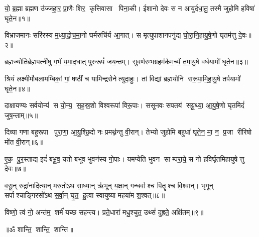 

यो॒ ब्र॒ह्मा ब्रह्मण उ॑ज्जहा॒र॒ प्रा॒णैः शिर॒ कृत्तिवासा पिना॒की।
ईशानो देवः स न आयु॑र्दधा॒तु॒ तस्मै जुहोमि हविषा॑ घृते॒न॥१॥

विभ्राजमानः सरि॑रस्य म॒ध्या॒द्रो॒च॒मा॒नो घर्मरुचि॑र्य आ॒गात्।
स मृत्युपाशानपनु॑द्य घो॒रा॒नि॒हा॒यु॒षे॒णो घृतम॑त्तु दे॒वः॥२॥

ब्रह्मज्योतिर्ब्रह्मपत्नी॑षु  ग॒र्भं॒ य॒मा॒द॒धात् पुरुरूपं॑ जय॒न्तम्।
सुवर्णरम्भग्रहम॑र्कम॒र्च्यं॒ त॒मा॒यु॒षे वर्धयामो॑ घृते॒न॥३॥

श्रियं लक्ष्मीमौबलामम्बिकां॒ गां॒ षष्ठीं च यामिन्द्रसेनेत्युदा॒हुः।
तां विद्यां ब्रह्मयोनि सरू॒पा॒मि॒हा॒यु॒षे तर्पयामो॑ घृते॒न॥४॥

दाक्षायण्यः सर्वयोन्य॑ स यो॒न्य॒ स॒ह॒स्र॒शो विश्वरूपा॑ विरू॒पाः।
ससूनवः सपतय॑ सयू॒थ्या॒ आ॒यु॒षे॒णो घृतमिदं॑ जुष॒न्ताम्॥५॥

दिव्या गणा बहुरूपा पुरा॒णा॒ आ॒यु॒श्छि॒दो नः प्रमथ्न॑न्तु वी॒रान्।
तेभ्यो जुहोमि बहुधा॑ घृते॒न॒ मा॒ न॒ प्र॒जा रीरिषो मो॑त वी॒रान्॥६॥

ए॒क॒ पु॒र॒स्ताद्य इदं॑ बभू॒व॒ यतो बभूव भुवन॑स्य गो॒पाः।
यमप्येति भुवन साम्परा॒ये॒ स नो हविर्घृतमिहायुषेत्तु दे॒वः॥७॥

व॒सू॒न् रुद्रा॑नादि॒त्या॒न् मरुतो॑ऽथ सा॒ध्या॒न् ऋ॑भून् य॒क्षा॒न् गन्धर्वाश्च पितॄश्च वि॒श्वान्।
 भृगून् सर्पाश्चाङ्गिरसो॑ऽथ स॒र्वा॒न् घृ॒त॒ हु॒त्वा स्वायुष्या महया॑म श॒श्वत्॥८॥

विष्णो॒ त्वं नो॒ अन्त॑म॒ शर्म॑ यच्छ सहन्त्य।
प्रते॒धारा॑ मधु॒श्चुत॒ उथ्सं॑ दुह्रते॒ अक्षि॑तम्॥९॥

\centerline{॥ॐ शान्ति॒ शान्ति॒ शान्ति॑॥}